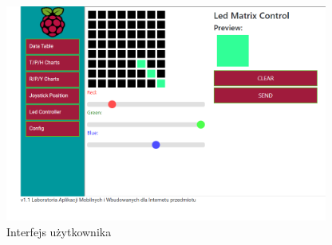 \documentclass{article}
\begin{document}
				\begin{figure}[!h]
					\includegraphics[width=400px]{webUI}
					\caption{Interfejs użytkownika}
				\end{figure}
\end{document}
